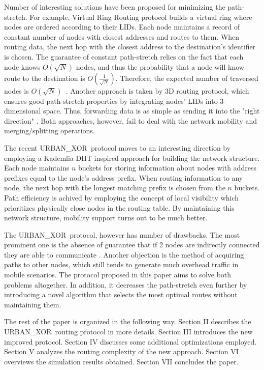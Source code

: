 \documentclass[14pt]{extarticle}
\theoremstyle{definition}
\newcommand{\urbanxor}{URBAN\_XOR}
\begin{document}
Number of interesting solutions have been proposed for minimizing the path-stretch. For example, Virtual Ring Routing protocol builds a virtual ring where nodes are ordered according to their LIDs. Each node maintains a record of constant number of nodes with closest addresses and routes to them. When routing data, the next hop with the closest address to the destination's identifier is chosen. The guarantee of constant path-stretch relies on the fact that each node knows $O(\sqrt{N})$ nodes, and thus the probability that a node will know route to the destination is $O(\frac{1}{\sqrt{N}})$. Therefore, the expected number of traversed nodes is $O(\sqrt{N})$~\cite{VRR}. Another approach is taken by 3D routing protocol, which ensures good path-stretch properties by integrating nodes' LIDs into 3-dimensional space. Thus, forwarding data is as simple as sending it into the "right direction" \cite{3drp}. Both approaches, however, fail to deal with the network mobility and merging/splitting operations. 

The recent \urbanxor\ protocol moves to an interesting direction by employing a Kademlia DHT inspired approach for building the network structure. Each node maintains $n$ buckets for storing information about nodes with address prefixes equal to the node's address prefix. When routing information to any node, the next hop with the longest matching prefix is chosen from the $n$ buckets. Path efficiency is achived by employing the concept of local visibility which prioritizes physically close nodes in the routing table. By maintaining this network structure, mobility support turns out to be much better.

The \urbanxor\ protocol, however has number of drawbacks. The most prominent one is the absence of guarantee that if 2 nodes are indirectly connected they are able to communicate \cite{Pasquini}. Another objection is the method of acquiring paths to other nodes, which still tends to generate much overhead traffic in mobile scenarios. The protocol proposed in this paper aims to solve both problems altogether. In addition, it decreases the path-stretch even further by introducing a novel algorithm that selects the most optimal routes without maintaining them.

The rest of the paper is organized in the following way. Section II describes the \urbanxor\ routing protocol in more details. Section III introduces the new improved protocol. Section IV discusses some additional optimizations employed. Section V analyzes the routing complexity of the new approach. Section VI overviews the simulation results obtained. Section VII concludes the paper.
\end{document}
